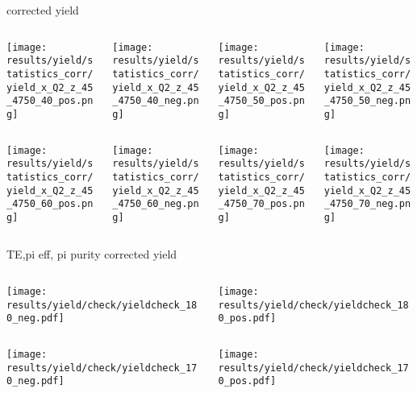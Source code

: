 \begin{frame}{corrected yield}
\begin{columns}
\begin{column}[T]{0.25\textwidth}
\texttt{[image: results/yield/statistics\_corr/yield\_x\_Q2\_z\_45\_4750\_40\_pos.png]}
\end{column}
\begin{column}[T]{0.25\textwidth}
\texttt{[image: results/yield/statistics\_corr/yield\_x\_Q2\_z\_45\_4750\_40\_neg.png]}
\end{column}
\begin{column}[T]{0.25\textwidth}
\texttt{[image: results/yield/statistics\_corr/yield\_x\_Q2\_z\_45\_4750\_50\_pos.png]}
\end{column}
\begin{column}[T]{0.25\textwidth}
\texttt{[image: results/yield/statistics\_corr/yield\_x\_Q2\_z\_45\_4750\_50\_neg.png]}
\end{column}
\end{columns}
\begin{columns}
\begin{column}[T]{0.25\textwidth}
\texttt{[image: results/yield/statistics\_corr/yield\_x\_Q2\_z\_45\_4750\_60\_pos.png]}
\end{column}
\begin{column}[T]{0.25\textwidth}
\texttt{[image: results/yield/statistics\_corr/yield\_x\_Q2\_z\_45\_4750\_60\_neg.png]}
\end{column}
\begin{column}[T]{0.25\textwidth}
\texttt{[image: results/yield/statistics\_corr/yield\_x\_Q2\_z\_45\_4750\_70\_pos.png]}
\end{column}
\begin{column}[T]{0.25\textwidth}
\texttt{[image: results/yield/statistics\_corr/yield\_x\_Q2\_z\_45\_4750\_70\_neg.png]}
\end{column}
\end{columns}
\end{frame}
\begin{frame}{TE,pi eff, pi purity corrected yield}
\begin{columns}
\begin{column}[T]{0.5\textwidth}
\texttt{[image: results/yield/check/yieldcheck\_180\_neg.pdf]}
\end{column}
\begin{column}[T]{0.5\textwidth}
\texttt{[image: results/yield/check/yieldcheck\_180\_pos.pdf]}
\end{column}
\end{columns}
\begin{columns}
\begin{column}[T]{0.5\textwidth}
\texttt{[image: results/yield/check/yieldcheck\_170\_neg.pdf]}
\end{column}
\begin{column}[T]{0.5\textwidth}
\texttt{[image: results/yield/check/yieldcheck\_170\_pos.pdf]}
\end{column}
\end{columns}
\end{frame}
